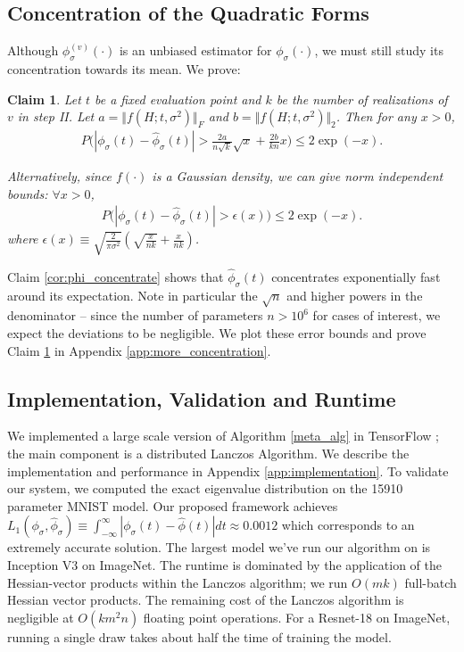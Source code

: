 \documentclass{article}
\newtheorem{claim}[theorem]{Claim}
\newcommand{\phis}{\phi_{\sigma}}
\newcommand{\phisv}{\phis^{(v)}}
\begin{document}
\subsection{Concentration of the Quadratic Forms} 
\label{sec:concentration}

Although $\phisv(\cdot)$ is an unbiased estimator for $\phis(\cdot)$, we must still study its concentration towards its mean. We prove:

\begin{claim}\label{cor:phi_concentrate}
Let $t$ be a fixed evaluation point and $k$ be the number of realizations of $v$ in step II. Let $a = \Vert f(H; t, \sigma^2) \Vert_F$ and $b = \Vert f(H; t, \sigma^2) \Vert_2$. Then for any $x>0$, 
\begin{align*} 
P\bigg(|\phis(t) - \widehat{\phi}_{\sigma}(t)| > \frac{2a}{n\sqrt{k}} \sqrt{x} +  \frac{2b}{k n} x \bigg) \leq 2\exp(-x).
\end{align*}

Alternatively, since $f(\cdot)$ is a Gaussian density, we can give norm independent bounds:  $\forall x > 0$, 
\begin{align} \label{eq:worst_case}
P\bigg(|\phis(t) - \widehat{\phi}_{\sigma}
(t)| > \epsilon(x) \bigg) \leq 2\exp(-x).
\end{align}
where $\epsilon(x) \equiv \sqrt{\frac{2}{\pi \sigma^2}} (\sqrt{\frac{x}{nk}} + \frac{x}{nk})$.
\end{claim}

Claim \eqref{cor:phi_concentrate} shows that $\widehat{\phi}_{\sigma}(t)$ concentrates exponentially fast around its expectation. Note in particular the $\sqrt{n}$ and higher powers in the denominator -- since the number of parameters $n > 10^6$ for cases of interest, we expect the deviations to be negligible. We plot these error bounds and prove Claim \ref{cor:phi_concentrate} in Appendix \ref{app:more_concentration}.

\subsection{Implementation, Validation and Runtime}
We implemented a large scale version of Algorithm \ref{meta_alg} in TensorFlow \cite{abadi2016tensorflow}; the main component is a distributed Lanczos Algorithm. We describe the implementation and performance in Appendix \ref{app:implementation}. To validate our system, we computed the exact eigenvalue distribution on the 15910 parameter MNIST model. Our proposed framework achieves $L_1(\phis, \widehat{\phi}_{\sigma}) \equiv \int_{-\infty}^{\infty} |\phis(t) -  \widehat{\phi}(t)|dt \approx 0.0012$ which corresponds to an extremely accurate solution. The largest model we've run our algorithm on is Inception V3 on ImageNet. The runtime is dominated by the application of the Hessian-vector products within the Lanczos algorithm; we run $O(mk)$ full-batch Hessian vector products. The remaining cost of the Lanczos algorithm is negligible at  $O(km^2n)$ floating point operations. For a Resnet-18 on ImageNet, running a single draw takes about half the time of training the model.
\end{document}
